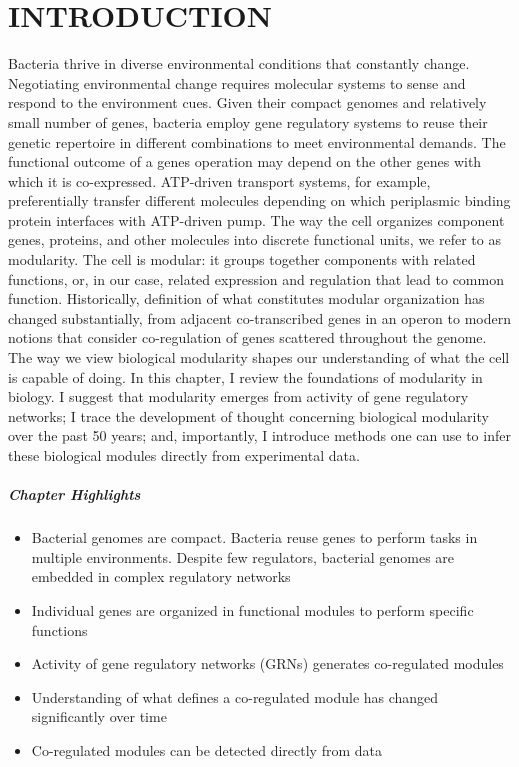  
\chapter {\uppercase{Introduction}}
\label{chap:1}

Bacteria thrive in diverse environmental conditions that constantly change. Negotiating environmental change requires molecular systems to sense and respond to the environment cues. Given their compact genomes and relatively small number of genes, bacteria employ gene regulatory systems to reuse their genetic repertoire in different combinations to meet environmental demands. The functional outcome of a genes operation may depend on the other genes with which it is co-expressed. ATP-driven transport systems, for example, preferentially transfer different molecules depending on which periplasmic binding protein interfaces with ATP-driven pump. The way the cell organizes component genes, proteins, and other molecules into discrete functional units, we refer to as modularity. The cell is modular: it groups together components with related functions, or, in our case, related expression and regulation that lead to common function. Historically, definition of what constitutes modular organization has changed substantially, from adjacent co-transcribed genes in an operon to modern notions that consider co-regulation of genes scattered throughout the genome. The way we view biological modularity shapes our understanding of what the cell is capable of doing. In this chapter, I review the foundations of modularity in biology. I suggest that modularity emerges from activity of gene regulatory networks; I trace the development of thought concerning biological modularity over the past 50 years; and, importantly, I introduce methods one can use to infer these biological modules directly from experimental data.  

 \paragraph{Chapter Highlights}

	\begin{itemize}
            \item Bacterial genomes are compact. Bacteria reuse genes to perform tasks in multiple environments. Despite few regulators, bacterial genomes are embedded in complex regulatory networks
            \item Individual genes are organized in functional modules to perform specific functions 
            \item Activity of gene regulatory networks (GRNs) generates co-regulated modules 
            \item Understanding of what defines a co-regulated module has changed significantly over time
            \item Co-regulated modules can be detected directly from data 
	\end{itemize}


